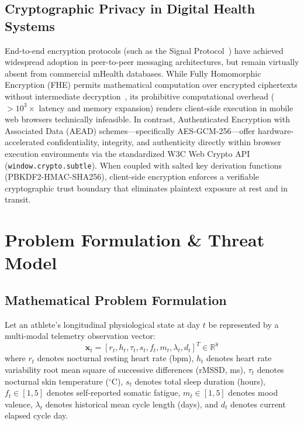 \documentclass[conference]{IEEEtran}
\begin{document}
\subsection{Cryptographic Privacy in Digital Health Systems}
End-to-end encryption protocols (such as the Signal Protocol~\cite{marlinspike2020}) have achieved widespread adoption in peer-to-peer messaging architectures, but remain virtually absent from commercial mHealth databases. While Fully Homomorphic Encryption (FHE) permits mathematical computation over encrypted ciphertexts without intermediate decryption~\cite{gentry2009}, its prohibitive computational overhead ($>10^3\times$ latency and memory expansion) renders client-side execution in mobile web browsers technically infeasible. In contrast, Authenticated Encryption with Associated Data (AEAD) schemes---specifically AES-GCM-256---offer hardware-accelerated confidentiality, integrity, and authenticity directly within browser execution environments via the standardized W3C Web Crypto API (\texttt{window.crypto.subtle}). When coupled with salted key derivation functions (PBKDF2-HMAC-SHA256), client-side encryption enforces a verifiable cryptographic trust boundary that eliminates plaintext exposure at rest and in transit.

\section{Problem Formulation \& Threat Model}

\subsection{Mathematical Problem Formulation}
Let an athlete's longitudinal physiological state at day $t$ be represented by a multi-modal telemetry observation vector:
\begin{equation}
\mathbf{x}_t = [r_t, h_t, \tau_t, s_t, f_t, m_t, \lambda_t, d_t]^T \in \mathbb{R}^8
\end{equation}
where $r_t$ denotes nocturnal resting heart rate (bpm), $h_t$ denotes heart rate variability root mean square of successive differences ($\text{rMSSD}$, ms), $\tau_t$ denotes nocturnal skin temperature ($^\circ$C), $s_t$ denotes total sleep duration (hours), $f_t \in [1, 5]$ denotes self-reported somatic fatigue, $m_t \in [1, 5]$ denotes mood valence, $\lambda_t$ denotes historical mean cycle length (days), and $d_t$ denotes current elapsed cycle day.
\end{document}
